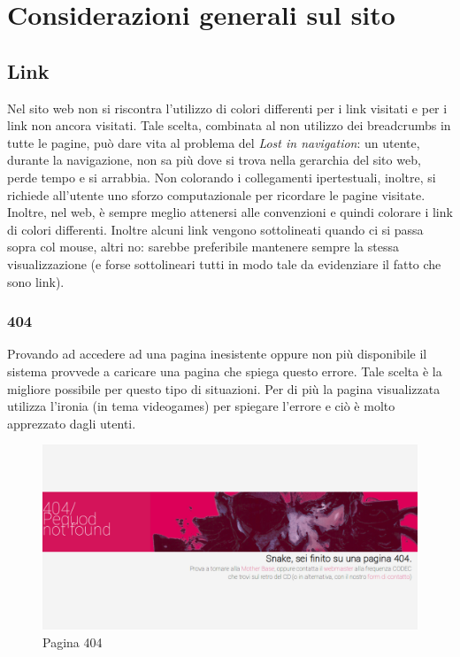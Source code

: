 \documentclass[../ProgettoTecWeb2.tex]{subfiles}
\begin{document}
\section{Considerazioni generali sul sito}
	
	\subsection{Link}
	Nel sito web non si riscontra l'utilizzo di colori differenti per i link visitati e per i link non ancora visitati. Tale scelta, combinata al non utilizzo dei breadcrumbs in tutte le pagine, può dare vita al problema del \textit{Lost in navigation}: un utente, durante la navigazione, non sa più dove si trova nella gerarchia del sito web, perde tempo e si arrabbia. Non colorando i collegamenti ipertestuali, inoltre, si richiede all'utente uno sforzo computazionale per ricordare le pagine visitate. Inoltre, nel web, è sempre meglio attenersi alle convenzioni e quindi colorare i link di colori differenti. Inoltre alcuni link vengono sottolineati quando ci si passa sopra col mouse, altri no: sarebbe preferibile mantenere sempre la stessa visualizzazione (e forse sottolineari tutti in modo tale da evidenziare il fatto che sono link).

		\subsubsection{404}
		Provando ad accedere ad una pagina inesistente oppure non più disponibile il sistema provvede a caricare una pagina che spiega questo errore. Tale scelta è la migliore possibile per questo tipo di situazioni. Per di più la pagina visualizzata utilizza l'ironia (in tema videogames) per spiegare l'errore e ciò è molto apprezzato dagli utenti.
		\begin{figure} [H]
			\centering
			\includegraphics[scale=0.3]{img/404}
			\caption{Pagina 404}
		\end{figure}
\end{document}
